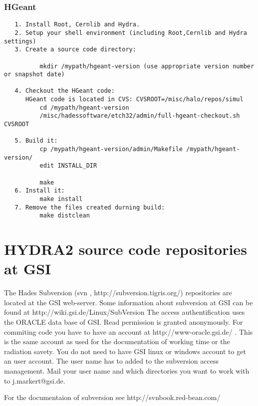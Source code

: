 \subsubsection{HGeant}

\begin{lstlisting}
   1. Install Root, Cernlib and Hydra.
   2. Setup your shell environment (including Root,Cernlib and Hydra settings)
   3. Create a source code directory:
          
          mkdir /mypath/hgeant-version (use appropriate version number or snapshot date)
   
   4. Checkout the HGeant code:
      HGeant code is located in CVS: CVSROOT=/misc/halo/repos/simul
          cd /mypath/hgeant-version
          /misc/hadessoftware/etch32/admin/full-hgeant-checkout.sh CVSROOT 
   
   5. Build it:
          cp /mypath/hgeant-version/admin/Makefile /mypath/hgeant-version/
          edit INSTALL_DIR
          
          make
   6. Install it:
          make install
   7. Remove the files created durning build:
          make distclean
\end{lstlisting}

\section{HYDRA2 source code repositories at GSI}\label{Chapter_HYDRA_repos}

The Hades Subversion (svn , http://subversion.tigris.org/) repositories are 
located at the GSI web-server. Some information about subversion at GSI can 
be found at http://wiki.gsi.de/Linux/SubVersion The access authentification 
uses the ORACLE data base of GSI. Read permission is granted anonymously. For 
commiting code you have to have an account at http://www-oracle.gsi.de/ . 
This is the same account as used for the documentation of working time or 
the radiation savety. You do not need to have GSI linux or windows account 
to get an user account. The user name has to added to the subversion access 
management. Mail your user name and which directories you want to work with 
to j.markert@gsi.de.


For the documentaion of subversion see http://svnbook.red-bean.com/

